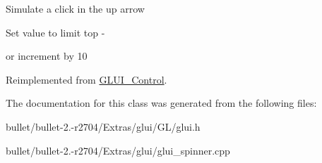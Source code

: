 Simulate a click in the up arrow \begin{DoxyVerb}                 Set value to limit top - 
\end{DoxyVerb}
 or increment by 10 

Reimplemented from \hyperlink{class_g_l_u_i___control}{G\+L\+U\+I\+\_\+\+Control}.



The documentation for this class was generated from the following files\+:\begin{DoxyCompactItemize}
\item 
bullet/bullet-\/2.-\/r2704/\+Extras/glui/\+G\+L/glui.\+h\item 
bullet/bullet-\/2.-\/r2704/\+Extras/glui/glui\+\_\+spinner.\+cpp\end{DoxyCompactItemize}
